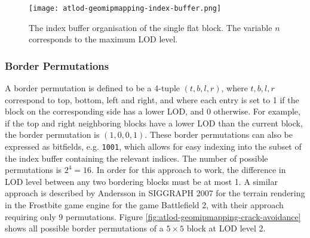 \begin{figure}[H]
  \centering
  \texttt{[image: atlod-geomipmapping-index-buffer.png]}
  \caption{The index buffer organisation of the single flat block. The variable $n$ corresponds to the maximum LOD level.}\label{fig:atlod-geomipmapping-index-buffers}
\end{figure}

\subsubsection{Border Permutations}
A border permutation is defined to be a 4-tuple $(t,b,l,r)$,
where $t,b,l,r$ correspond to top, bottom, left and right, and where each entry is set to 1 if the block on 
the corresponding side has a lower LOD, and 0 otherwise. For example, if the top and right neighboring blocks
have a lower LOD than the current block, the border permutation is $(1,0,0,1)$.
These border permutations can also be expressed as bitfields, e.g. \texttt{1001},
which allows for easy indexing into the subset of the index buffer containing the relevant indices.
The number of possible permutations is $2^4=16$.
In order for this approach to work, the difference in LOD level between any two bordering blocks 
must be at most 1. 
A similar approach is described by Andersson in SIGGRAPH 2007 for the terrain rendering 
in the Frostbite game engine for the game Battlefield 2, with their approach requiring only 9 permutations.
Figure \ref{fig:atlod-geomipmapping-crack-avoidance} shows all possible border permutations of a $5 \times 5$ block at LOD level 2.

